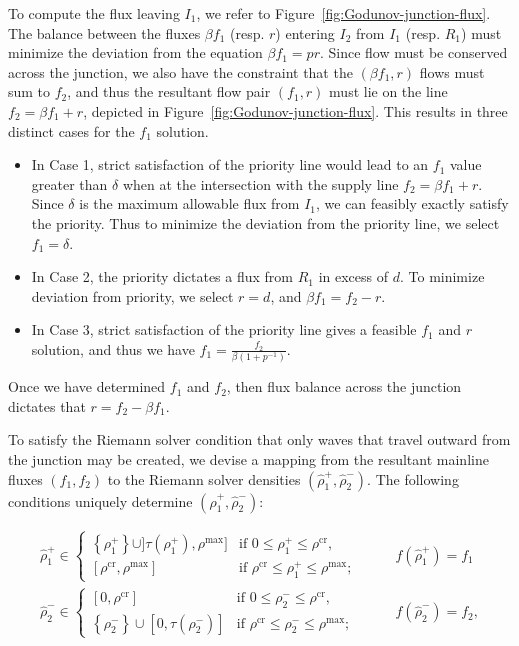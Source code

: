 To compute the flux leaving $I_1$, we refer to Figure~\ref{fig:Godunov-junction-flux}. The balance between the fluxes $\beta f_1$ (resp. $r$) entering $I_2$  from $I_1$ (resp. $R_1$) must minimize the deviation from the equation $\beta f_1 = p r$. Since flow must be conserved across the junction, we also have the constraint that the $\left(\beta f_1, r\right)$ flows must sum to $f_2$, and thus the resultant flow pair $\left(f_1, r\right)$ must lie on the line $f_2 = \beta f_1 + r$, depicted in Figure~\ref{fig:Godunov-junction-flux}. This results in three distinct cases for the $f_1$ solution.

\begin{itemize}
	\item In Case 1, strict satisfaction of the priority line would lead to an $f_1$ value greater than $\delta$ when at the intersection with the supply line $f_2 = \beta f_1 + r$. Since $\delta$ is the maximum allowable flux from $I_1$, we can feasibly exactly satisfy the priority. Thus to minimize the deviation from the priority line, we select $f_1 = \delta$.
	\item In Case 2, the priority dictates a flux from $R_1$ in excess of $d$. To minimize deviation from priority, we select $r = d$, and $\beta f_1 = f_2 - r$.
	\item In Case 3, strict satisfaction of the priority line gives a feasible $f_1$ and $r$ solution, and thus we have $f_1 = \frac{f_2}{\beta \left(1 + p^{-1}\right)}$.
\end{itemize}


Once we have determined $f_1$ and $f_2$, then flux balance across the junction dictates that $r = f_2 - \beta f_1$.

To satisfy the Riemann solver condition that only waves that travel outward from the junction may be created, we devise a mapping from the resultant mainline fluxes $\left(f_1, f_2\right)$ to the Riemann solver densities $\left(\hat{\rho}_1^+, \hat{\rho}_2^-\right)$. The following conditions uniquely determine $\left(\hat{\rho}_1^+, \hat{\rho}_2^-\right)$:

\begin{align}
\hat{\rho}_1^+ \in
\begin{cases}
\left\{\rho_1^+\right\}\cup ]\tau(\rho_1^+),\rho^{\max}] & \text{if } 0 \le \rho_1^+ \le \rho^\text{cr}, \\
\left[\rho^{\text{cr}}, \rho^{\max}\right] & \text{if }  \rho^\text{cr} \le  \rho_1^+ \le \rho^{\max};
\end{cases} &\quad  & f\left(\hat{\rho}_1^+\right) = f_1 \\
\hat{\rho}_2^- \in
\begin{cases}
\left[0,\rho^{\text{cr}}\right] & \text{if } 0 \le \rho_2^- \le \rho^\text{cr}, \\
 \left\{\rho_2^-\right\}\cup [0,\tau(\rho_2^-)]
 & \text{if }  \rho^\text{cr} \le  \rho_2^- \le \rho^{\max};
\end{cases} &\quad  & f\left(\hat{\rho}_2^-\right) = f_2,
\end{align}

